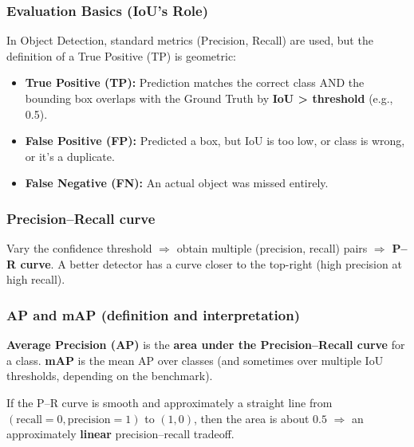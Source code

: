 \documentclass[11pt,a4paper]{article}
\begin{document}
\subsubsection{Evaluation Basics (IoU's Role)}

\begin{defbox}
In Object Detection, standard metrics (Precision, Recall) are used, but the definition of a True Positive (TP) is geometric:
\begin{itemize}
  \item \textbf{True Positive (TP):} Prediction matches the correct class AND the bounding box overlaps with the Ground Truth by \textbf{IoU > threshold} (e.g., 0.5).
  \item \textbf{False Positive (FP):} Predicted a box, but IoU is too low, or class is wrong, or it's a duplicate.
  \item \textbf{False Negative (FN):} An actual object was missed entirely.
\end{itemize}
\end{defbox}

\subsubsection{Precision--Recall curve}

\begin{defbox}
Vary the confidence threshold $\Rightarrow$ obtain multiple (precision, recall) pairs $\Rightarrow$ \textbf{P--R curve}.
A better detector has a curve closer to the top-right (high precision at high recall).
\end{defbox}

\subsubsection{AP and mAP (definition and interpretation)}

\begin{defbox}
\textbf{Average Precision (AP)} is the \textbf{area under the Precision--Recall curve} for a class.
\textbf{mAP} is the mean AP over classes (and sometimes over multiple IoU thresholds, depending on the benchmark).
\end{defbox}

\begin{notebox}
If the P--R curve is smooth and approximately a straight line from $(\text{recall}=0,\text{precision}=1)$ to $(1,0)$,
then the area is about $0.5$ \(\Rightarrow\) an approximately \textbf{linear} precision--recall tradeoff.
\end{notebox}
\end{document}
